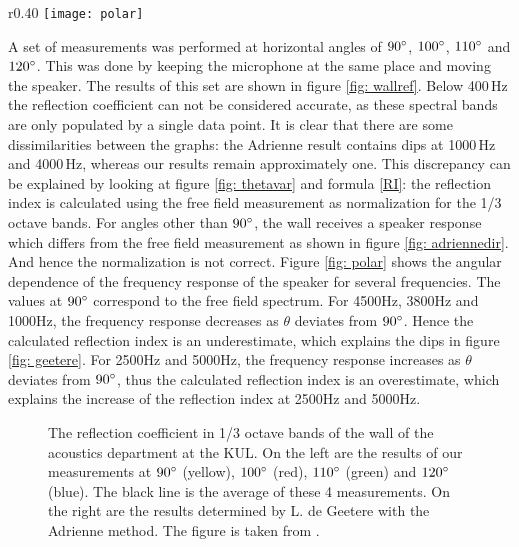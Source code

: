 \begin{wrapfigure}{r}{0.40\textwidth}
	\vspace{-10pt}
  \centering
    \texttt{[image: polar]}
  \caption{Angular dependence of the frequency response of the speaker for certain frequencies.}
  \label{fig: polar}
\end{wrapfigure}
A set of measurements was performed at horizontal angles of $90^{\circ}$, $100^{\circ}$, $110^{\circ}$ and $120^{\circ}$. This was done by keeping the microphone at the same place and moving the speaker. The results of this set are shown in figure \ref{fig: wallref}. Below 400\,Hz the reflection coefficient can not be considered accurate, as these spectral bands are only populated by a single data point. It is clear that there are some dissimilarities between the graphs: the Adrienne result contains dips at 1000\,Hz and 4000\,Hz, whereas our results remain approximately one. This discrepancy can be explained by looking at figure \ref{fig: thetavar} and formula \ref{RI}: the reflection index is calculated using the free field measurement as normalization for the 1/3 octave bands. For angles other than $90^{\circ}$, the wall receives a  speaker response which differs from the free field measurement as shown in figure \ref{fig: adriennedir}. And hence the normalization is not correct. Figure \ref{fig: polar} shows the angular dependence of the frequency response of the speaker for several frequencies. The values at $90^{\circ}$ correspond to the free field spectrum. For 4500Hz, 3800Hz and 1000Hz, the frequency response decreases as $\theta$ deviates from $90^{\circ}$. Hence the calculated reflection index is an underestimate, which explains the dips in figure \ref{fig: geetere}. For 2500Hz and 5000Hz, the frequency response increases as $\theta$ deviates from $90^{\circ}$, thus the calculated reflection index is an overestimate, which explains the increase of the reflection index at 2500Hz and 5000Hz. 

\begin{figure}[h!]
  \centering
  \caption{The reflection coefficient in 1/3 octave bands of the wall of the acoustics department at the KUL. On the left are the results of our measurements at $90^{\circ}$ (yellow), $100^{\circ}$ (red), $110^{\circ}$ (green) and $120^{\circ}$ (blue). The black line is the average of these 4 measurements. On the right are the results determined by L. de Geetere with the Adrienne method. The figure is taken from \cite[p.68]{Geetere}.}
  \label{fig: reflection}
\end{figure}



%
